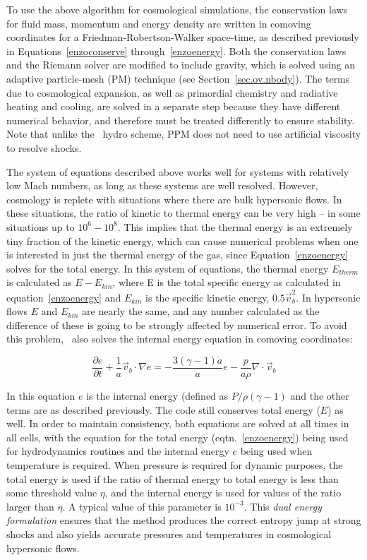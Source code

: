 To use the above algorithm for cosmological simulations, the
conservation laws for fluid mass, momentum and energy 
density are written in comoving coordinates for a
Friedman-Robertson-Walker space-time, as described previously 
in Equations~\ref{enzoconserve} 
through~\ref{enzoenergy}.  Both the conservation laws and
the Riemann solver are modified to include gravity, which is solved
using an adaptive particle-mesh (PM) technique (see Section~\ref{sec.ov.nbody}).  
The terms due to cosmological expansion, as well as primordial chemistry and
radiative heating and cooling, are solved in a separate step because they have
different numerical behavior, and therefore must be treated differently to ensure
stability.  Note that unlike the \zeus\ hydro scheme, PPM does not need to use 
artificial viscosity to resolve shocks.

The system of equations described above works well for systems with
relatively low Mach numbers, as long as these systems are well resolved.  
However, cosmology is replete with situations where there are bulk hypersonic
flows.  In these situations, the ratio of kinetic to thermal energy can be
very high -- in some situations up to $10^6 - 10^8$.  This implies that the
thermal energy is an extremely tiny fraction of the kinetic energy, which can 
cause numerical problems when one is interested in just the thermal energy of the gas, since
 Equation~\ref{enzoenergy} solves for the total energy.  In this system of
equations, the
 thermal energy $E_{therm}$ is calculated as $E - E_{kin}$, 
where E is the total specific energy as
calculated in equation~\ref{enzoenergy} and $E_{kin}$ is the specific kinetic energy,
$0.5 \vec{v}_b^2$.  
In hypersonic flows $E$ and $E_{kin}$ are nearly the same, and any 
number calculated as 
the difference of these is going to be strongly affected by numerical error.  To 
avoid this problem, \enzo\ also solves the internal energy equation in
comoving coordinates:

\begin{equation}
\frac{\partial e}{\partial t} + \frac{1}{a} \vec{v}_b \cdot \nabla e = 
- \frac{3(\gamma-1)\dot{a}}{a}e - \frac{p}{a \rho} \nabla \cdot \vec{v}_b
\label{enzointenergy}
\end{equation}

In this equation $e$ is the internal energy (defined as $P/\rho (\gamma-1)$ and the other terms are as described
previously.  The code still conserves total energy ($E$) as well.  In order
to maintain consistency, both equations are solved at all times in all cells,
with the equation for the total energy (eqtn.~\ref{enzoenergy}) being used
for hydrodynamics routines and the internal energy $e$ being used when 
temperature is required.  When pressure is required for dynamic purposes,
the total energy is used if the ratio of thermal energy to total energy
is less than some threshold value $\eta$, and the internal energy is used
for values of the ratio larger than $\eta$.  A typical value of this parameter
is $10^{-3}$.  This \emph{dual energy formulation} ensures that the
method produces the correct entropy jump at strong shocks and also
yields accurate pressures and temperatures in cosmological hypersonic
flows.


